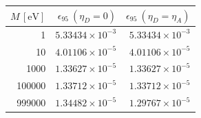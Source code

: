 \begin{center}\begin{tabular}{rrr}\toprule $M\,[\mathrm{eV}]$ & $\epsilon_{95}\ (\eta_D=0)$ & $\epsilon_{95}\ (\eta_D=\eta_A)$ \\ \midrule
1 & $5.33434\times10^{-3}$ & $5.33434\times10^{-3}$ \\
10 & $4.01106\times10^{-5}$ & $4.01106\times10^{-5}$ \\
1000 & $1.33627\times10^{-5}$ & $1.33627\times10^{-5}$ \\
100000 & $1.33712\times10^{-5}$ & $1.33712\times10^{-5}$ \\
999000 & $1.34482\times10^{-5}$ & $1.29767\times10^{-5}$ \\
\bottomrule\end{tabular}\end{center}
